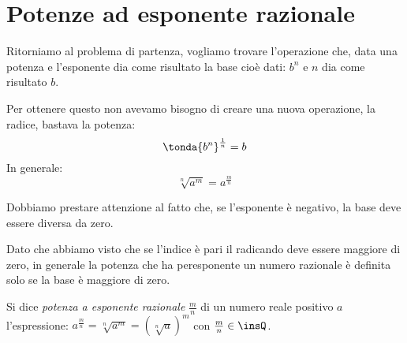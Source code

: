 \begin{comment}
\begin{esempio}
 Determina le condizioni di esistenza della radice 
 \(\sqrt[4]{\dfrac{x-1}{x+1}}\).

C.E. \(\dfrac{x-1}{x+1}\ge 0\). 
Occorre discutere il segno della frazione \(f\), combinando il segno del 
numeratore \(N\) e del denominatore \(D\):

\begin{center}
 
\end{center}
Pertanto C.E. \(x<-1\vee x\ge 1\).
\end{esempio}


\end{comment}

\section{Potenze ad esponente razionale}
\label{sec:radicali_esp_razionale}

Ritorniamo al problema di partenza, vogliamo trovare l'operazione che, data 
una potenza e l'esponente dia come risultato la base cioè dati: \(b^n\) e 
\(n\) dia come risultato \(b\).

Per ottenere questo non avevamo bisogno di creare una nuova operazione, la 
radice, bastava la potenza:
\[\tonda{b^n}^\frac{1}{n}=b\]
In generale:
\[\sqrt[n]{a^m}=a^\frac{m}{n}\]
\begin{osservazione}
 Dobbiamo prestare attenzione al fatto che, se l'esponente è negativo, la 
base deve essere diversa da zero.
\end{osservazione}

\begin{osservazione}
Dato che abbiamo visto che se l'indice è pari il radicando deve essere 
maggiore di zero, in generale la potenza che ha peresponente un numero 
razionale è definita solo se la base è maggiore di zero.
\end{osservazione}

\begin{definizione}
Si dice \emph{potenza a esponente razionale} \(\frac m n\) di un numero reale 
positivo \(a\) l'espressione:
 \(a^{\frac m n}=\sqrt[n]{a^m}=\left(\sqrt[n]a\right)^m\) con 
 \(\frac m n\in \insQ\).
\end{definizione}

